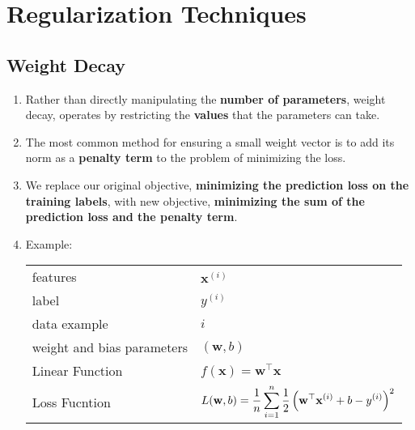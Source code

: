 \chapter{Regularization Techniques} \label{chapter: regularization techniques}

\section{Weight Decay \cite{dnn-1}}\label{regularization techniques: Weight Decay}

\begin{enumerate}[itemsep=0.2cm]
    \item Rather than directly manipulating the \textbf{number of parameters}, weight decay, operates by restricting the \textbf{values} that the parameters can take.

    \item The most common method for ensuring a small weight vector is to add its norm as a \textbf{penalty term} to the problem of minimizing the loss.

    \item We replace our original objective, \textbf{minimizing the prediction loss on the training labels}, with new objective, \textbf{minimizing the sum of the prediction loss and the penalty term}.

    \item Example:
    \begin{customTableWrapper}{2}
        \begin{table}[H]
            \centering
            \begin{tabular}{l l}
                features & $\mathbf{x}^{(i)}$ \\

                label & $y^{(i)}$ \\

                data example & $i$ \\

                weight and bias parameters & $(\mathbf{w}, b)$ \\
            
                Linear Function & $f(\mathbf{x}) = \mathbf{w}^\top \mathbf{x}$ \\
    
                Loss Fucntion & $L(\mathbf{w}, b) = \dfrac{1}{n}\displaystyle\sum_{i=1}^n \dfrac{1}{2}\left(\mathbf{w}^\top \mathbf{x}^{(i)} + b - y^{(i)}\right)^2$ \\


\end{tabular}
\end{table}
\end{customTableWrapper}
\end{enumerate}
